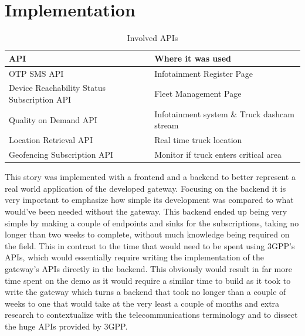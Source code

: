 \section{Implementation}

\begin{table}[H]
	\centering %
	\begin{tabular}{|p{6cm} | p{6cm}|}
		\hline
		{\centering \textbf{API}\par}                                & {\centering \textbf{Where it was used}\par}                  \\ [1ex]
		\hline\hline
		{\centering OTP SMS API\par}                                 & {\centering Infotainment Register Page\par}                  \\
		\hline
		{\centering Device Reachability Status Subscription API\par} & {\centering Fleet Management Page\par}                       \\
		\hline
		{\centering Quality on Demand API\par}                       & {\centering Infotainment system \& Truck dashcam stream\par} \\
		\hline
		{\centering Location Retrieval API\par}                      & {\centering Real time truck location\par}                    \\
		\hline
		{\centering Geofencing Subscription API\par}                 & {\centering Monitor if truck enters critical area\par}       \\ [1ex]
		\hline
	\end{tabular}
	\caption{Involved APIs}
\end{table}

This story was implemented with a frontend and a backend to better represent a
real world application of the developed gateway. Focusing on the backend it is
very important to emphasize how simple its development was compared to what
would've been needed without the gateway. This backend ended up being very
simple by making a couple of endpoints and sinks for the subscriptions, taking
no longer than two weeks to complete, without much knowledge being required on
the field. This in contrast to the time that would need to be spent using
3GPP's APIs, which would essentially require writing the implementation of the
gateway's APIs directly in the backend. This obviously would result in far more
time spent on the demo as it would require a similar time to build as it took
to write the gateway which turns a backend that took no longer than a couple of
weeks to one that would take at the very least a couple of months and extra
research to contextualize with the telecommunications terminology and to
dissect the huge APIs provided by 3GPP.

